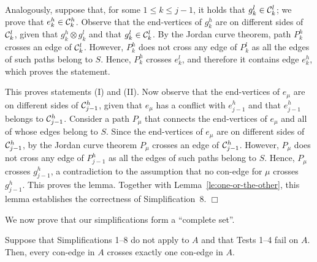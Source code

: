 \documentclass[letter,runningheads]{llncs}
\renewenvironment{proof}
{{\em Proof.\ }}{\hspace*{\fill}$\Box$\par\vspace{2mm}}
\newcommand{\conf}{\otimes}
\begin{document}
\begin{proof}
Analogously, suppose that, for some $1\leq k\leq j-1$, it holds that $g^l_k\in {\cal C}^l_k$; we prove that $e^h_{k}\in {\cal C}^h_{k}$. Observe that the end-vertices of $g^h_k$ are on different sides of ${\cal C}^l_k$, given that $g^h_k\conf g^l_k$ and that $g^l_k\in {\cal C}^l_k$. By the Jordan curve theorem, path $P^h_k$ crosses an edge of ${\cal C}^l_k$. However, $P^h_k$ does not cross any edge of $P^l_k$ as all the edges of such paths belong to $S$. Hence, $P^h_k$ crosses $e^l_k$, and therefore it contains edge $e^h_k$, which proves the statement.

This proves statements (I) and (II). Now observe that the end-vertices of $e_{\mu}$ are on different sides of ${\cal C}^h_{j-1}$, given that $e_{\mu}$ has a conflict with $e^h_{j-1}$ and that $e^h_{j-1}$ belongs to ${\cal C}^h_{j-1}$. Consider a path $P_{\mu}$ that connects the end-vertices of $e_{\mu}$ and all of whose edges belong to $S$. Since the end-vertices of $e_{\mu}$ are on different sides of ${\cal C}^h_{j-1}$, by the Jordan curve theorem $P_{\mu}$ crosses an edge of ${\cal C}^h_{j-1}$. However, $P_{\mu}$ does not cross any edge of $P^h_{j-1}$ as all the edges of such paths belong to $S$. Hence, $P_{\mu}$ crosses $g^h_{j-1}$, a contradiction to the assumption that no con-edge for $\mu$ crosses $g^h_{j-1}$. This proves the lemma. Together with Lemma~\ref{le:one-or-the-other}, this lemma establishes the correctness of {\sc Simplification~8}.
\end{proof}

We now prove that our simplifications form a ``complete set''.
\begin{lemma} \label{le:no-simplification-single-conflict}
Suppose that {\sc Simplifications 1--8} do not apply to $A$ and that {\sc Tests 1--4} fail on $A$. Then, every con-edge in $A$ crosses exactly one con-edge in $A$.
\end{lemma}
\end{document}
